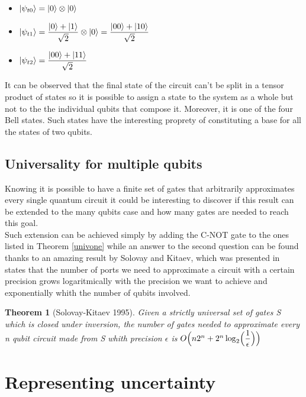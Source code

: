 \documentclass{article}
\newtheorem{theorem}{Theorem}
\begin{document}
\begin{itemize}
	\item $\ket{\psi_{t0}} = \ket{0} \otimes \ket{0}$
	\item $\ket{\psi_{t1}} = \dfrac{\ket{0}+\ket{1}}{\sqrt{2}} \otimes \ket{0} = \dfrac{\ket{00}+\ket{10}}{\sqrt{2}}$
	\item $\ket{\psi_{t2}} = \dfrac{\ket{00}+\ket{11}}{\sqrt{2}}$

\end{itemize}
It can be observed that the final state of the circuit can't be split
in a tensor product of states so it is possible to assign a state to
the system as a whole but not to the the individual qubits that compose it.
Moreover, it is one of the four Bell states.
Such states have the interesting proprety of constituting a base for all
the states of two qubits.


\subsection{Universality for multiple qubits}
Knowing it is possible to have a finite set of gates that arbitrarily approximates
every single quantum circuit it could be interesting to discover if this result
can be extended to the many qubits case and how many gates are needed to reach this goal.\\
Such extension can be achieved simply by adding the C-NOT gate to the ones listed in
Theorem \ref{univone} while an answer to the second question can be found
thanks to an amazing result by Solovay and Kitaev, which was presented in \cite{kitaev2002classical}
states that the number of ports we need to approximate a circuit with a certain
precision grows logaritmically with the precision we want to achieve and exponentially
whith the number of qubits involved.

\begin{theorem}[Solovay-Kitaev 1995]

	Given a strictly universal set of gates S which is closed under inversion,
	the number of gates needed to approximate every n qubit circuit made
	from S whith precision $\epsilon$ is
	$O\Bigl(n2^n+2^n\log_2 \Bigl( \dfrac{1}{\epsilon}\Bigl)\Bigl)$

\end{theorem}



\section{Representing uncertainty}
\end{document}
